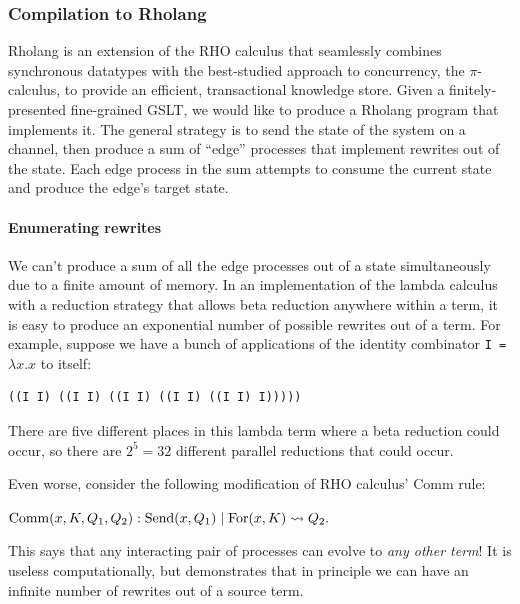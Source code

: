 \documentclass{article}
\begin{document}
\subsubsection{Compilation to Rholang}
\label{comp_to_rholang}

Rholang is an extension of the RHO calculus that seamlessly combines synchronous datatypes with the best-studied approach to concurrency, the $\pi$-calculus, to provide an efficient, transactional knowledge store.  Given a finitely-presented fine-grained GSLT, we would like to produce a Rholang program that implements it.  The general strategy is to send the state of the system on a channel, then produce a sum of ``edge'' processes that implement rewrites out of the state.  Each edge process in the sum attempts to consume the current state and produce the edge's target state.


\paragraph{Enumerating rewrites}
\label{enum_rewrites}

We can't produce a sum of all the edge processes out of a state simultaneously due to a finite amount of memory.  In an implementation of the lambda calculus with a reduction strategy that allows beta reduction anywhere within a term, it is easy to produce an exponential number of possible rewrites out of a term.  For example, suppose we have a bunch of applications of the identity combinator \verb+I = +$\lambda x.x$ to itself:

\begin{verbatim}
((I I) ((I I) ((I I) ((I I) ((I I) I)))))
\end{verbatim}

There are five different places in this lambda term where a beta reduction could occur, so there are $2^5 = 32$ different parallel reductions that could occur.

Even worse, consider the following modification of RHO calculus' Comm rule: \bigskip

\noindent ${\rm Comm}(x, K, Q_1, Q_2): {\rm Send}(x, Q_1) \;|\; {\rm For}(x, K) \leadsto Q_2.$ \bigskip

\noindent This says that any interacting pair of processes can evolve to {\em any other term}!  It is useless computationally, but demonstrates that in principle we can have an infinite number of rewrites out of a source term.
\end{document}
